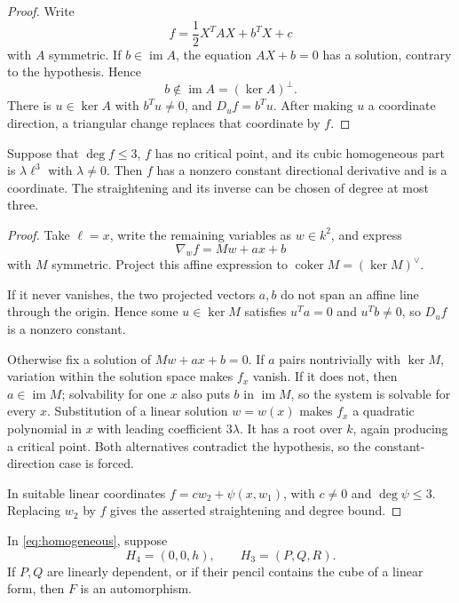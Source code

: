 \documentclass[11pt,reqno]{amsart}
\begin{document}
\begin{proof}
Write
\[
f=\frac12X^TAX+b^TX+c
\]
with \(A\) symmetric.  If \(b\in\operatorname{im}A\), the equation
\(AX+b=0\) has a solution, contrary to the hypothesis.  Hence
\[
b\notin\operatorname{im}A=(\ker A)^\perp.
\]
There is \(u\in\ker A\) with \(b^Tu\ne0\), and \(D_uf=b^Tu\).  After making
\(u\) a coordinate direction, a triangular change replaces that coordinate
by \(f\).
\end{proof}

\begin{lemma}
\label{lem:cubic-coordinate}
Suppose that \(\deg f\le3\), \(f\) has no critical point, and its cubic
homogeneous part is \(\lambda\ell^3\) with \(\lambda\ne0\).  Then \(f\) has
a nonzero constant directional derivative and is a coordinate.  The
straightening and its inverse can be chosen of degree at most three.
\end{lemma}

\begin{proof}
Take \(\ell=x\), write the remaining variables as \(w\in k^2\), and express
\[
\nabla_wf=Mw+ax+b
\]
with \(M\) symmetric.  Project this affine expression to
\(\operatorname{coker}M=(\ker M)^\vee\).

If it never vanishes, the two projected vectors \(a,b\) do not span an
affine line through the origin.  Hence some \(u\in\ker M\) satisfies
\(u^Ta=0\) and \(u^Tb\ne0\), so \(D_uf\) is a nonzero constant.

Otherwise fix a solution of \(Mw+ax+b=0\).  If \(a\) pairs nontrivially with
\(\ker M\), variation within the solution space makes \(f_x\) vanish.  If it
does not, then \(a\in\operatorname{im}M\); solvability for one \(x\) also
puts \(b\) in \(\operatorname{im}M\), so the system is solvable for every
\(x\).  Substitution of a linear solution \(w=w(x)\) makes \(f_x\) a
quadratic polynomial in \(x\) with leading coefficient \(3\lambda\).  It
has a root over \(k\), again producing a critical point.  Both alternatives
contradict the hypothesis, so the constant-direction case is forced.

In suitable linear coordinates \(f=cw_2+\psi(x,w_1)\), with \(c\ne0\) and
\(\deg\psi\le3\).  Replacing \(w_2\) by \(f\) gives the asserted
straightening and degree bound.
\end{proof}

\begin{proposition}
\label{prop:easy-branches}
In \eqref{eq:homogeneous}, suppose
\[
H_4=(0,0,h),\qquad H_3=(P,Q,R).
\]
If \(P,Q\) are linearly dependent, or if their pencil contains the cube of a
linear form, then \(F\) is an automorphism.
\end{proposition}
\end{document}
